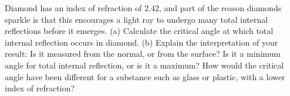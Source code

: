Diamond has an index of refraction of 2.42, and part of
the reason diamonds sparkle is that this encourages a light
ray to undergo many total internal reflections before it
emerges. (a) Calculate the critical angle at which total
internal reflection occurs in diamond. \answercheck
(b) Explain the
interpretation of your result: Is it measured from the
normal, or from the surface? Is it a minimum angle for total
internal reflection, or is it a maximum?
How would the critical angle have been different for a
substance such as glass or plastic, with a lower index of refraction?
